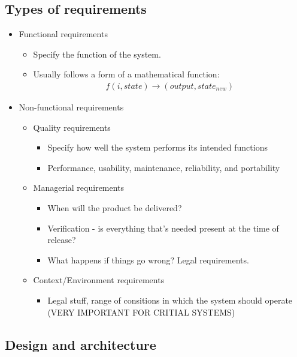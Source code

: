 \documentclass[12pt]{book}
\begin{document}
\subsection*{Types of requirements}
\begin{itemize}
  \item Functional requirements
  \begin{itemize}
    \item Specify the function of the system.
    \item Usually follows a form of a mathematical function: \begin{align*}
      f(i, state)\rightarrow (output, state_{new})
    \end{align*}
  \end{itemize} 

  \item Non-functional requirements
  \begin{itemize}
    \item Quality requirements
    \begin{itemize}
      \item Specify how well the system performs its intended functions
      \item Performance, usability, maintenance, reliability, and portability
    \end{itemize} 

    \item Managerial requirements
    \begin{itemize}
      \item When will the product be delivered?
      \item Verification - is everything that's needed present at the time of release?
      \item What happens if things go wrong? Legal requirements.
    \end{itemize} 

    \item Context/Environment requirements
    \begin{itemize}
      \item Legal stuff, range of consitions in which the system should operate (VERY IMPORTANT FOR CRITIAL SYSTEMS)
    \end{itemize} 
  \end{itemize} 
\end{itemize}

\subsection*{Design and architecture}
\end{document}

